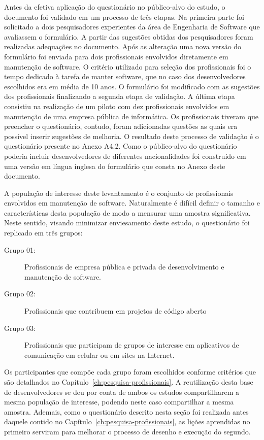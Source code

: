 Antes da efetiva aplicação do questionário no público-alvo do estudo, o
documento foi validado em um processo de três etapas. Na primeira parte foi
solicitado a dois pesquisadores experientes da área de Engenharia de Software
que avaliassem o formulário. A partir das sugestões obtidas dos pesquisadores
foram realizadas adequações no documento. Após as alteração uma nova versão do
formulário foi enviada para dois profissionais envolvidos diretamente em
manutenção de software. O critério utilizado para seleção dos profissionais foi
o tempo dedicado à tarefa de manter software, que no caso dos desenvolvedores
escolhidos era em média de 10 anos. O formulário foi modificado com as sugestões
dos profissionais finalizando a segunda etapa de validação. A última etapa
consistiu na realização de um piloto com dez profissionais envolvidos em
manutenção de uma empresa pública de informática. Os profissionais tiveram que
preencher o questionário, contudo, foram adicionadas questões as quais era
possível inserir sugestões de melhoria. O resultado deste processo de validação
é o questionário presente no Anexo A4.2\@. Como o público-alvo do questionário
poderia incluir desenvolvedores de diferentes nacionalidades foi construído em
uma versão em língua inglesa do formulário que consta no Anexo deste documento.


A população de interesse deste levantamento é o conjunto de profissionais
envolvidos em manutenção de software. Naturalmente é difícil definir o tamanho e
características desta população de modo a mensurar uma amostra significativa.
Neste sentido, visando minimizar enviesamento deste estudo, o questionário
foi replicado em três grupos:

\begin{description}
	\item[Grupo 01:] Profissionais de empresa pública e privada de
			desenvolvimento e manutenção de software.
	\item[Grupo 02:] Profissionais que contribuem em projetos de
		código aberto
   	\item[Grupo 03:] Profissionais que participam de grupos de
		interesse em aplicativos de comunicação em celular ou em sites na
		Internet.
\end{description}

Os participantes que compõe cada grupo foram escolhidos conforme critérios que
são detalhados no Capítulo~\ref{ch:pesquisa-profissionais}. A reutilização desta
base de desenvolvedores se deu por conta de ambos os estudos compartilharem a
mesma população de interesse, podendo neste caso compartilhar a mesma amostra.
Ademais, como o questionário descrito nesta seção foi realizada antes daquele
contido no Capítulo~\ref{ch:pesquisa-profissionais}, as lições aprendidas no
primeiro serviram para melhorar o processo de desenho e execução do segundo.

